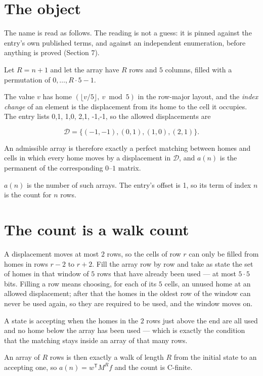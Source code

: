 \documentclass[11pt]{article}
\theoremstyle{definition}
\begin{document}
\section{The object}

The name is read as follows. The reading is not a guess: it is pinned against the entry's own published terms, and against an independent enumeration, before anything is proved (Section 7).

Let $R = n + 1$ and let the array have $R$ rows and $5$ columns, filled with a permutation of $0,\dots,R\cdot5-1$.

The value $v$ has home $(\lfloor v/5\rfloor,\ v \bmod 5)$ in the row-major layout, and the {\itshape index change} of an element is the displacement from its home to the cell it occupies. The entry lists 0,1, 1,0, 2,1, -1,-1, so the allowed displacements are

\[\mathcal{D} = \{(-1,-1), (0,1), (1,0), (2,1)\}.\]

An admissible array is therefore exactly a perfect matching between homes and cells in which every home moves by a displacement in $\mathcal{D}$, and $a(n)$ is the permanent of the corresponding $0$--$1$ matrix.

$a(n)$ is the number of such arrays. The entry's offset is 1, so its term of index $n$ is the count for $n$ rows.

\section{The count is a walk count}

A displacement moves at most $2$ rows, so the cells of row $r$ can only be filled from homes in rows $r-2$ to $r+2$. Fill the array row by row and take as state the set of homes in that window of $5$ rows that have already been used --- at most $5\cdot5$ bits. Filling a row means choosing, for each of its $5$ cells, an unused home at an allowed displacement; after that the homes in the oldest row of the window can never be used again, so they are required to be used, and the window moves on.

A state is accepting when the homes in the $2$ rows just above the end are all used and no home below the array has been used --- which is exactly the condition that the matching stays inside an array of that many rows.

An array of $R$ rows is then exactly a walk of length $R$ from the initial state to an accepting one, so $a(n) = w^{\mathsf T}M^{R}f$ and the count is C-finite.
\end{document}
